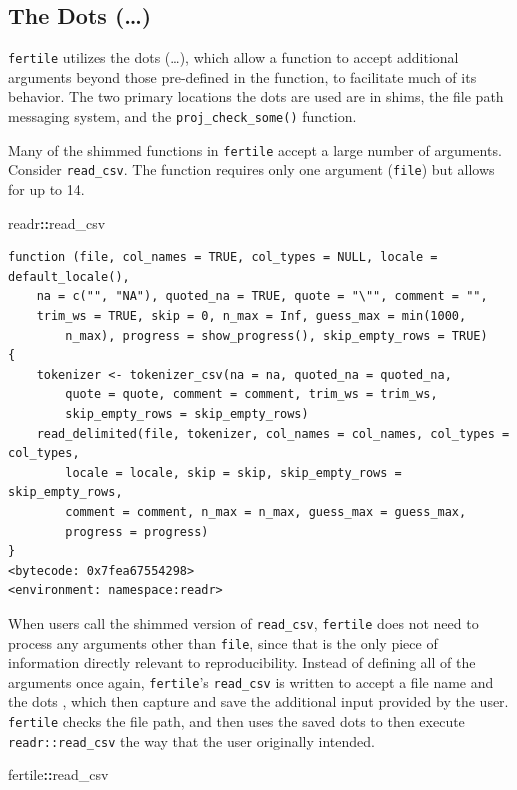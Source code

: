 \documentclass[12pt,twoside]{reedthesis}
\newenvironment{Shaded}{\begin{snugshade}}{\end{snugshade}}
\newcommand{\NormalTok}[1]{#1}
\newcommand{\OperatorTok}[1]{\textcolor[rgb]{0.81,0.36,0.00}{\textbf{#1}}}
\begin{document}
\hypertarget{the-dots}{%
\subsection{The Dots (\ldots)}\label{the-dots}}

\texttt{fertile} utilizes the dots (\ldots), which allow a function to accept additional arguments beyond those pre-defined in the function, to facilitate much of its behavior. The two primary locations the dots are used are in shims, the file path messaging system, and the \texttt{proj\_check\_some()} function.

Many of the shimmed functions in \texttt{fertile} accept a large number of arguments. Consider \texttt{read\_csv}. The function requires only one argument (\texttt{file}) but allows for up to 14.
\begin{Shaded}
\begin{Highlighting}[]
\NormalTok{readr}\OperatorTok{::}\NormalTok{read_csv}
\end{Highlighting}
\end{Shaded}
\begin{verbatim}
function (file, col_names = TRUE, col_types = NULL, locale = default_locale(), 
    na = c("", "NA"), quoted_na = TRUE, quote = "\"", comment = "", 
    trim_ws = TRUE, skip = 0, n_max = Inf, guess_max = min(1000, 
        n_max), progress = show_progress(), skip_empty_rows = TRUE) 
{
    tokenizer <- tokenizer_csv(na = na, quoted_na = quoted_na, 
        quote = quote, comment = comment, trim_ws = trim_ws, 
        skip_empty_rows = skip_empty_rows)
    read_delimited(file, tokenizer, col_names = col_names, col_types = col_types, 
        locale = locale, skip = skip, skip_empty_rows = skip_empty_rows, 
        comment = comment, n_max = n_max, guess_max = guess_max, 
        progress = progress)
}
<bytecode: 0x7fea67554298>
<environment: namespace:readr>
\end{verbatim}
When users call the shimmed version of \texttt{read\_csv}, \texttt{fertile} does not need to process any arguments other than \texttt{file}, since that is the only piece of information directly relevant to reproducibility. Instead of defining all of the arguments once again, \texttt{fertile}'s \texttt{read\_csv} is written to accept a file name and the dots , which then capture and save the additional input provided by the user. \texttt{fertile} checks the file path, and then uses the saved dots to then execute \texttt{readr::read\_csv} the way that the user originally intended.
\begin{Shaded}
\begin{Highlighting}[]
\NormalTok{fertile}\OperatorTok{::}\NormalTok{read_csv}
\end{Highlighting}
\end{Shaded}
\end{document}

